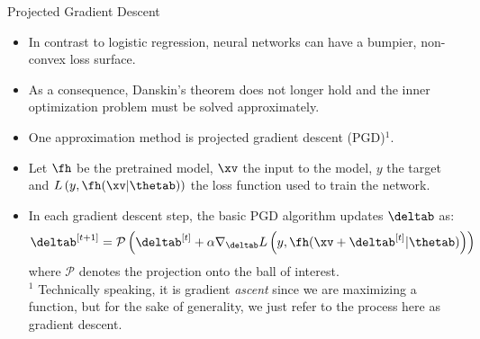  \begin{vbframe}{Projected Gradient Descent}
    \begin{itemize}
       \item In contrast to logistic regression, neural networks can have a bumpier, 
       non-convex loss surface.     
       \item As a consequence, Danskin's theorem does not longer hold and the inner optimization problem must be solved approximately. 
       \item One approximation method is projected gradient descent (PGD)$^1$.
        \item Let $\fh$ be the pretrained model, $\xv$ the input to the model, $y$ the target and $L\left(y, \fh(\xv | \thetab) \right)$ the loss function used to train the network.
        \item In each gradient descent step, the basic PGD algorithm updates $\deltab$ as: 
        \begin{equation*}
            \deltab^{[t+1]} = \mathcal{P}\left(\deltab^{[t]} + \alpha \nabla_{\deltab} L\left(y, \fh(\xv + \deltab^{[t]}| \thetab) \right) \right)
        \end{equation*}
        where $\mathcal{P}$ denotes the projection onto the ball of interest. \\
        \lz
        {\scriptsize $^1$ Technically speaking, it is gradient \textit{ascent} since we are maximizing a function, but for the sake of generality, we just refer to the process here as gradient descent.}


        

\end{itemize}
\end{vbframe}
